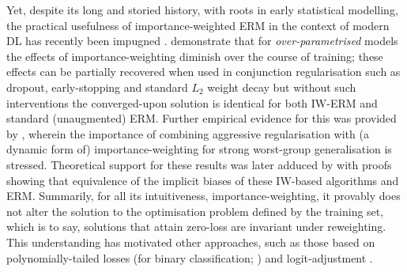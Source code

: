 Yet, despite its long and storied history, with roots in early statistical modelling, the practical
usefulness of importance-weighted \ac{ERM} in the context of modern \acf{DL} has recently been
impugned \citep{byrd2019effect, zhai2022understanding}.
%
\citet{byrd2019effect} demonstrate that for \emph{over-parametrised} models the effects of
importance-weighting diminish over the course of training; these effects can be partially recovered
when used in conjunction regularisation such as dropout, early-stopping and standard \(L_2\) weight
decay but without such interventions the converged-upon solution is identical for both
\ac{IW}-\ac{ERM} and standard (unaugmented) \ac{ERM}. 
%
Further empirical evidence for this was provided by \citet{sagawa2019distributionally}, wherein the
importance of combining aggressive regularisation with (a dynamic form of) importance-weighting for
strong worst-group generalisation is stressed.
%
Theoretical support for these results was later adduced by \citet{zhai2022understanding} with proofs
showing that equivalence of the implicit biases of these \ac{IW}-based algorithms and \ac{ERM}.
%
Summarily, for all its intuitiveness, importance-weighting, it provably does not alter the solution
to the optimisation problem defined by the training set, which is to say, solutions that attain
zero-loss are invariant under reweighting.
%
This understanding has motivated other approaches, such as those based on polynomially-tailed
losses (for binary classification; \citealp{wang2021importance}) and logit-adjustment
\citep{menon2020long}.
%

